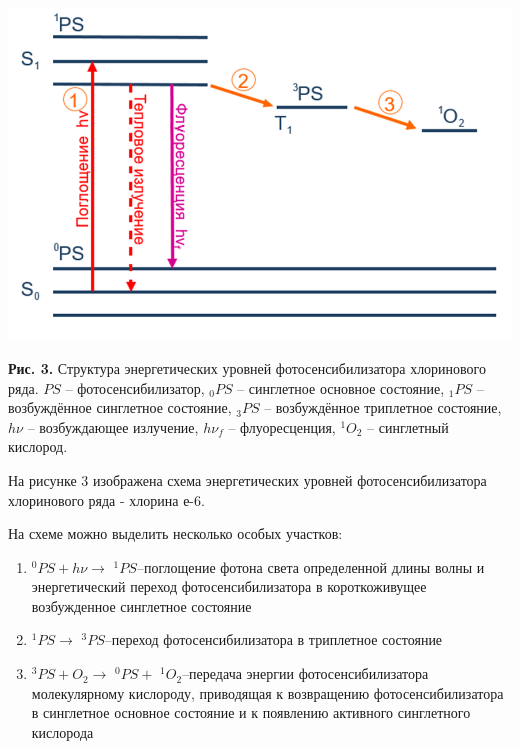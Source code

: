\documentclass[a4paper,14pt]{extarticle}
\begin{document}
\begin{center}
    \includegraphics[scale = 0.6]{levels.png}
    
    \textbf{Рис. 3.} Структура энергетических уровней фотосенсибилизатора хлоринового ряда.
    $PS$ – фотосенсибилизатор,
    $_0PS$ – синглетное основное состояние,
    $_1PS$ – возбуждённое синглетное состояние,
    $_3PS$ – возбуждённое триплетное состояние,
    $h\nu$ – возбуждающее излучение,
    $h\nu_f$ – флуоресценция,
    $^1O_2$ – синглетный кислород.
\end{center}

На рисунке 3 изображена схема энергетических уровней фотосенсибилизатора хлоринового ряда - хлорина е-6. 

На схеме можно выделить несколько особых участков:
\begin{enumerate}
    \item $^0PS + h\nu \xrightarrow{} $ $^1PS $–поглощение фотона света определенной длины волны и энергетический переход фотосенсибилизатора в короткоживущее возбужденное синглетное состояние
    \item $^1PS \xrightarrow{} $ $^3PS $–переход фотосенсибилизатора в триплетное состояние
    \item $^3PS + O_2 \xrightarrow{} $ $^0PS +$ $ ^1O_2 $–передача энергии фотосенсибилизатора молекулярному кислороду, приводящая к возвращению фотосенсибилизатора в синглетное основное состояние и к появлению активного синглетного кислорода
\end{enumerate}
\end{document}
